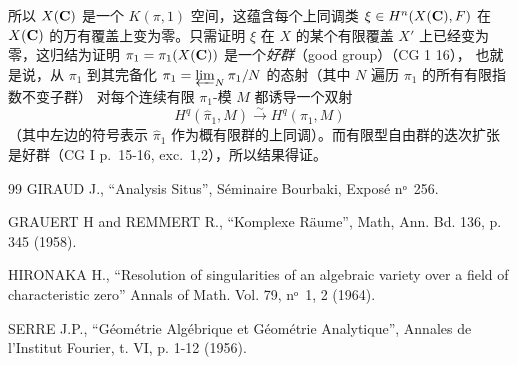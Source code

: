 所以 $X(\mathbf{C})$ 是一个 $K(\pi,1)$ 空间，这蕴含每个上同调类 $\xi\in H^n(X(\mathbf{C}),F)$ 在 $X(\mathbf{C})$ 的万有覆盖上变为零。只需证明 $\xi$ 在 $X$ 的某个有限覆盖 $X'$ 上已经变为零，这归结为证明 $\pi_1=\pi_1(X(\mathbf{C}))$ 是\pageoriginale 一个\emph{好群}（good group）（\cf CG 1 16）， %
也就是说，从 $\pi_1$ 到其完备化 ${\pi}_1=\varprojlim_N \pi_1/N$ 的态射（其中 $N$ 遍历 $\pi_1$ 的所有有限指数不变子群）
对每个连续有限 $\pi_1$-模 $M$ 都诱导一个双射
$$
H^q(\widehat{\pi}_1,M)\xrightarrow{\sim} H^q(\pi_1,M)
$$
（其中左边的符号表示 $\widehat{\pi}_1$ 作为概有限群的上同调）。而有限型自由群的迭次扩张是好群（\cf CG I p.~15-16, exc.~1,2），所以结果得证。 %

\begin{thebibliography}{99}
 GIRAUD J., ``Analysis Situs'', Séminaire
Bourbaki, Exposé nᵒ~256.

 GRAUERT H and REMMERT R., ``Komplexe Räume'',
Math, Ann. Bd. 136, p. 345 (1958).

 HIRONAKA H., ``Resolution of singularities of an
algebraic variety over a field of characteristic zero'' Annals of
Math. Vol. 79, nᵒ~1, 2 (1964).

 SERRE J.P., ``Géométrie Algébrique et Géométrie
Analytique'', Annales de l'Institut Fourier, t. VI, p. 1-12 (1956).
\end{thebibliography}
